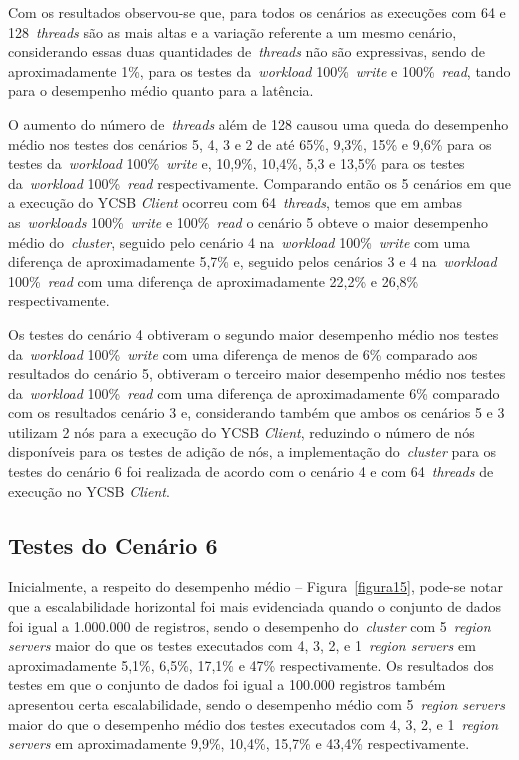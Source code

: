 \documentclass[12pt]{article}
\begin{document}
Com os resultados observou-se que, para todos os cenários as execuções com 64 e 128~\emph{threads} são as mais altas e a variação referente a um mesmo cenário, considerando essas duas quantidades de~\emph{threads} não são expressivas, sendo de aproximadamente 1\%, para os testes da~\emph{workload} 100\%~\emph{write} e 100\%~\emph{read}, tando para o desempenho médio quanto para a latência.

O aumento do número de~\emph{threads} além de 128 causou uma queda do desempenho médio nos testes dos cenários 5, 4, 3 e 2 de até 65\%, 9,3\%, 15\% e 9,6\% para os testes da~\emph{workload} 100\%~\emph{write} e, 10,9\%, 10,4\%, 5,3 e 13,5\% para os testes da~\emph{workload} 100\%~\emph{read} respectivamente. Comparando então os 5 cenários em que a execução do YCSB \emph{Client} ocorreu com 64~\emph{threads}, temos que em ambas as~\emph{workloads} 100\%~\emph{write} e 100\%~\emph{read} o cenário 5 obteve o maior desempenho médio do~\emph{cluster}, seguido pelo cenário 4 na~\emph{workload} 100\%~\emph{write} com uma diferença de aproximadamente 5,7\% e, seguido pelos cenários 3 e 4 na~\emph{workload} 100\%~\emph{read} com uma diferença de aproximadamente 22,2\% e 26,8\% respectivamente.

Os testes do cenário 4 obtiveram o segundo maior desempenho médio nos testes da~\emph{workload} 100\%~\emph{write} com uma diferença de menos de 6\% comparado aos resultados do cenário 5, obtiveram o terceiro maior desempenho médio nos testes da~\emph{workload} 100\%~\emph{read} com uma diferença de aproximadamente 6\% comparado com os resultados cenário 3 e, considerando também que ambos os cenários 5 e 3 utilizam 2 nós para a execução do YCSB \emph{Client}, reduzindo o número de nós disponíveis para os testes de adição de nós, a implementação do~\emph{cluster} para os testes do cenário 6 foi realizada de acordo com o cenário 4 e com 64~\emph{threads} de execução no YCSB \emph{Client}.


\subsection{Testes do Cenário 6}

Inicialmente, a respeito do desempenho médio -- Figura~\ref{figura15}, pode-se notar que a escalabilidade horizontal foi mais evidenciada quando o conjunto de dados foi igual a 1.000.000 de registros, sendo o desempenho do~\emph{cluster} com 5~\emph{region servers} maior do que os testes executados com 4, 3, 2, e 1~\emph{region servers} em aproximadamente 5,1\%, 6,5\%, 17,1\% e 47\% respectivamente. 
Os resultados dos testes em que o conjunto de dados foi igual a 100.000 registros também apresentou certa escalabilidade, sendo o desempenho médio com 5~\emph{region servers} maior do que o desempenho médio dos testes executados com 4, 3, 2, e 1~\emph{region servers} em aproximadamente 9,9\%, 10,4\%, 15,7\% e 43,4\% respectivamente.
\end{document}
